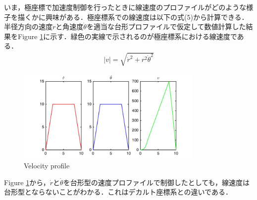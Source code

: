 \documentclass[twocolumn,oneside,a4paper]{article}
\begin{document}
いま，極座標で加速度制御を行ったときに線速度のプロファイルがどのような様子を描くかに興味がある．極座標系での線速度は以下の式(5)から計算できる．半径方向の速度$\dot{r}$と角速度$\dot{\theta}$を適当な台形プロファイルで仮定して数値計算した結果をFigure \ref{fig:jerk}に示す．緑色の実線で示されるのが極座標系における線速度である．
\begin{eqnarray}
	|v| = \sqrt{ \dot{r}^2+ r^2 \dot{\theta}^2 } 
\end{eqnarray}

\begin{figure}[htbp]
    \includegraphics[bb=0 0 432 216,width=9cm]{accel.pdf}
    \caption{Velocity profile}
    \label{fig:jerk}
\end{figure}

Figure \ref{fig:jerk}から，$\dot{r}$と$\dot{\theta}$を台形型の速度プロファイルで制御したとしても，線速度は台形型とならないことがわかる．これはデカルト座標系との違いである．
\end{document}
